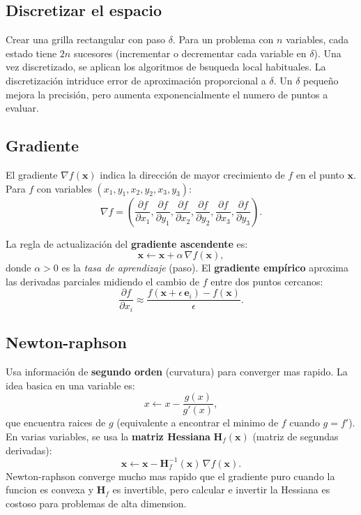 \subsection{Discretizar el espacio}
Crear una grilla rectangular con paso $\delta$. Para un problema con $n$ variables, cada estado tiene $2n$ sucesores (incrementar o decrementar cada variable en $\delta$). Una
vez discretizado, se aplican los algoritmos de bsuqueda local habituales.
La discretización intriduce error de aproximación proporcional a $\delta$. Un $\delta$ pequeño mejora la precisión, pero aumenta exponencialmente el numero de puntos a evaluar.

\subsection{Gradiente}
\begin{definition}[Gradiente]
    El gradiente $\nabla f(\mathbf{x})$ indica la dirección de mayor
    crecimiento de $f$ en el punto $\mathbf{x}$. Para $f$ con variables
    $(x_1, y_1, x_2, y_2, x_3, y_3)$:
    \[
      \nabla f = \left(\frac{\partial f}{\partial x_1},
                       \frac{\partial f}{\partial y_1},
                       \frac{\partial f}{\partial x_2},
                       \frac{\partial f}{\partial y_2},
                       \frac{\partial f}{\partial x_3},
                       \frac{\partial f}{\partial y_3}\right).
    \]
  \end{definition}

La regla de actualización del \textbf{gradiente ascendente} es:
  \[
    \mathbf{x} \leftarrow \mathbf{x} + \alpha\,\nabla f(\mathbf{x}),
  \]
  donde $\alpha > 0$ es la \emph{tasa de aprendizaje} (paso). El
  \textbf{gradiente empírico} aproxima las derivadas parciales midiendo
  el cambio de $f$ entre dos puntos cercanos:
  \[
    \frac{\partial f}{\partial x_i} \approx
    \frac{f(\mathbf{x} + \epsilon\,\mathbf{e}_i) - f(\mathbf{x})}{\epsilon}.
  \]

\subsection{Newton-raphson}
Usa información de \textbf{segundo orden} (curvatura) para converger mas rapido. La idea basica en una variable es:
\[
  x \leftarrow x - \frac{g(x)}{g'(x)},
\]
que encuentra raices de $g$ (equivalente a encontrar el minimo de $f$ cuando $g = f'$). En varias variables, se usa la \textbf{matriz Hessiana}
$\mathbf{H}_f(\mathbf{x})$ (matriz de segundas derivadas):
\[
  \mathbf{x} \leftarrow \mathbf{x} - \mathbf{H}_f^{-1}(\mathbf{x})\,\nabla f(\mathbf{x}).
\]
Newton-raphson converge mucho mas rapido que el gradiente puro cuando la funcion es convexa y $\mathbf{H}_f$ es invertible, pero calcular e invertir la 
Hessiana es costoso para problemas de alta dimension.


